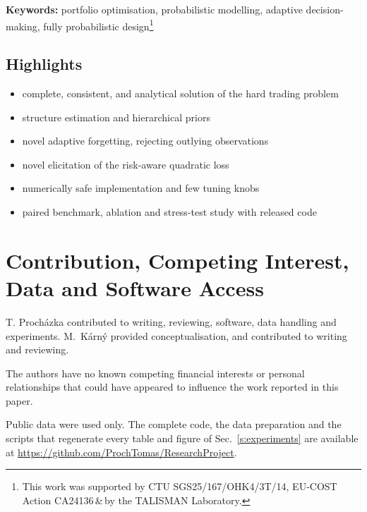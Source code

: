 \documentclass[final,3p,times,twocolumn]{elsarticle}
\newcommand{\bl}[1]{{\color{blue}#1}}                    %
\begin{document}
\maketitle
{}

\noindent\textbf{Keywords:} portfolio optimisation, probabilistic modelling, adaptive decision-making, fully probabilistic design\footnote{This work was supported by CTU SGS25/167/OHK4/3T/14, EU-COST Action CA24136\,\&\,by the TALISMAN Laboratory.}

\subsection*{Highlights}
\begin{itemize}
\item complete, consistent, and analytical solution of the hard trading problem
\item structure estimation and hierarchical priors
\item \bl{novel adaptive forgetting, rejecting outlying observations}
\item novel elicitation of the risk-aware quadratic loss
\item \bl{numerically safe implementation and few tuning knobs}
\item \bl{paired benchmark, ablation and stress-test study with released code}
 \end{itemize}









% 



\section*{Contribution, Competing Interest, Data and Software Access}
T. Proch\'{a}zka contributed to writing, reviewing, software, data handling and experiments. M.\ K\'{a}rn\'{y} provided  conceptualisation, and contributed to writing  and reviewing.

The authors have no known competing financial interests or personal relationships that could have appeared to influence the work reported in this paper.

\label{s:software} \bl{Public data were used only. The complete code, the data preparation and the scripts that regenerate every table and figure of Sec.~\ref{s:experiments} are available at \url{https://github.com/ProchTomas/ResearchProject}.}
\end{document}

